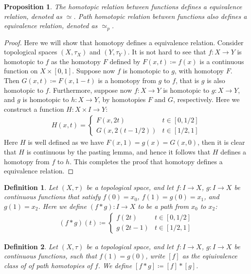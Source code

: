 \documentclass[11pt]{book}
\theoremstyle{break}
\theoremstyle{break}
\newtheorem{prop}[lem]{Proposition}
\newtheorem{defn}{Definition}[corL]
\begin{document}
\begin{prop}
The homotopic relation between functions defines a equivalence relation, denoted as $\simeq$. Path homotopic relation between functions also defines a equivalence relation, denoted as $\simeq_p$. 
\end{prop}
\begin{proof}
Here we will show that homotopy defines a equivalence relation. Consider topological spaces $(X,\tau_X)$ and $(Y,\tau_Y)$. It is not hard to see that $f:X \to Y$ is homotopic to $f$ as the homotopy $F$ defined by $F(x,t) \coloneqq f(x)$ is a continuous function on $X \times [0,1]$. Suppose now $f$ is homotopic to $g$, with homotopy $F$. Then $G(x,t) \coloneqq F(x,1-t)$ is a homotopy from $g$ to $f$, that is $g$ is also homotopic to $f$. Furthermore, suppose now $f:X\to Y$ is homotopic to $g:X\to Y$, and $g$ is homotopic to $h:X\to Y$, by homotopies $F$ and $G$, respectively. Here we construct a function $H:X\times I \to Y$:
\begin{align*}
H(x,t) = \begin{cases}
F(x,2t) & t \in [0,1/2]\\
G(x,2(t-1/2)) & t \in [1/2, 1]
\end{cases}
\end{align*}
Here $H$ is well defined as we have $F(x,1) = g(x) = G(x,0)$, then it is clear that $H$ is continuous by the pasting lemma, and hence it follows that $H$ defines a homotopy from $f$ to $h$. This completes the proof that homotopy defines a equivalence relation. 
\end{proof}

\begin{defn}
Let $(X,\tau)$ be a topological space, and let $f:I \to X$, $g:I \to X $ be continuous functions that satisfy $f(0)= x_0$, $f(1) = g(0) = x_1$, and $g(1) = x_2$. Here we define $(f*g):I \to X$ to be a path from $x_0$ to $x_2$:
\begin{align*}
(f*g)(t) \coloneqq \begin{cases}
f(2t) & t \in [0,1/2]
\\
g(2t-1 ) & t \in [1/2,1]
\end{cases}
\end{align*}
\end{defn}

\begin{defn}
Let $(X,\tau)$ be a topological space, and let $f:I \to X$, $g:I \to X$ be continuous functions, such that $f(1) = g(0)$, write $[f] $ as the eqiuivalence class of of path homotopies of $f$. We define $[f*g]\coloneqq [f]*[g]$.
\end{defn}
\end{document}
